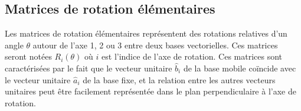 \subsection{Matrices de rotation élémentaires}

Les matrices de rotation élémentaires représentent des rotations relatives d'un angle $\theta$ autour de l'axe 1, 2 ou 3 entre deux bases vectorielles. Ces matrices seront notées $R_i(\theta)$ où $i$ est l'indice de l'axe de rotation. Ces matrices sont caractérisées par le fait que le vecteur unitaire $\hat{b}_i$ de la base mobile coïncide avec le vecteur unitaire $\hat{a}_i$ de la base fixe, et la relation entre les autres vecteurs unitaires peut être facilement représentée dans le plan perpendiculaire à l'axe de rotation.



